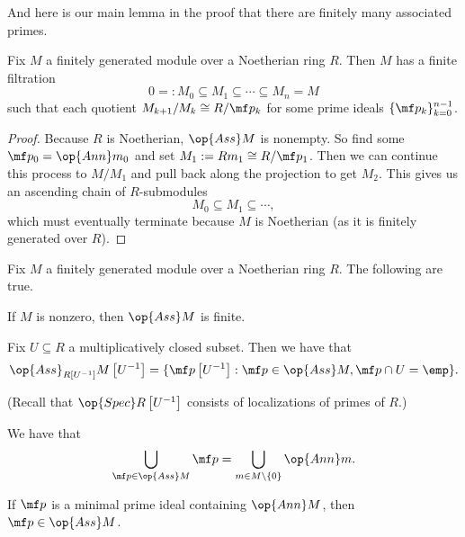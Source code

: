 And here is our main lemma in the proof that there are finitely many associated primes.
\begin{lemma} \label{lem:fingenfiltration}
	Fix $M$ a finitely generated module over a Noetherian ring $R$. Then $M$ has a finite filtration
	\[0=:M_0\subseteq M_1\subseteq\cdots\subseteq M_n=M\]
	such that each quotient $M_{k+1}/M_k\cong R/\mf p_k$ for some prime ideals $\{\mf p_k\}_{k=0}^{n-1}$.
\end{lemma}
\begin{proof}
	Because $R$ is Noetherian, $\op{Ass}M$ is nonempty. So find some $\mf p_0=\op{Ann}m_0$ and set $M_1:=Rm_1\cong R/\mf p_1$. Then we can continue this process to $M/M_1$ and pull back along the projection to get $M_2$. This gives us an ascending chain of $R$-submodules
	\[M_0\subseteq M_1\subseteq\cdots,\]
	which must eventually terminate because $M$ is Noetherian (as it is finitely generated over $R$).
\end{proof}
\begin{theorem}
	Fix $M$ a finitely generated module over a Noetherian ring $R$. The following are true.
	\begin{listalph}
		\item If $M$ is nonzero, then $\op{Ass}M$ is finite.
		\item Fix $U\subseteq R$ a multiplicatively closed subset. Then we have that
		\[\op{Ass}_{R\left[U^{-1}\right]}M\left[U^{-1}\right]=\{\mf p\left[U^{-1}\right]:\mf p\in\op{Ass}M,\mf p\cap U=\emp\}.\]

		(Recall that $\op{Spec}R\left[U^{-1}\right]$ consists of localizations of primes of $R$.)
		\item We have that
		\[\bigcup_{\mf p\in\op{Ass}M}\mf p=\bigcup_{m\in M\setminus\{0\}}\op{Ann}m.\]
		\item If $\mf p$ is a minimal prime ideal containing $\op{Ann}M$, then $\mf p\in\op{Ass}M$.
	\end{listalph}
\end{theorem}
